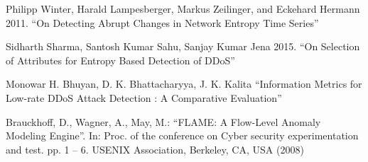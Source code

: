 \documentclass[]{interact}
\theoremstyle{plain}%
\theoremstyle{definition}
\theoremstyle{remark}
\begin{document}
\begin{thebibliography}{}

Philipp Winter, Harald Lampesberger,
Markus Zeilinger, and Eckehard Hermann 2011. ``On Detecting Abrupt Changes
in Network Entropy Time Series''

Sidharth Sharma, Santosh Kumar Sahu,  Sanjay Kumar Jena 2015. ``On Selection of Attributes for Entropy Based
Detection of DDoS''

Monowar H. Bhuyan, D. K. Bhattacharyya, J. K. Kalita ``Information Metrics for Low-rate DDoS Attack
Detection : A Comparative Evaluation''

Brauckhoff, D., Wagner, A., May, M.: ``FLAME: A Flow-Level Anomaly Modeling
Engine''. In: Proc. of the conference on Cyber security experimentation and test.
pp. 1 – 6. USENIX Association, Berkeley, CA, USA (2008)


\end{thebibliography}
\end{document}
